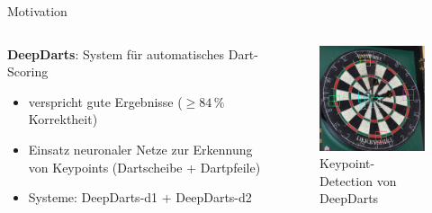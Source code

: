 \begin{frame}{Motivation}

    \begin{columns}
        \begin{column}{0.6\linewidth}

            \textbf{DeepDarts}: System für automatisches Dart-Scoring
            \begin{itemize}
                \item verspricht gute Ergebnisse ($\geq 84\,\%$ Korrektheit)
                \item Einsatz neuronaler Netze zur Erkennung von Keypoints (Dartscheibe + Dartpfeile)
                \item Systeme: DeepDarts-d1 + DeepDarts-d2
            \end{itemize}

        \end{column}
        \begin{column}{0.4\linewidth}

            \begin{figure}
                \centering
                \includegraphics[width=0.8\linewidth]{imgs/dd_keypoints.pdf}
                \vspace*{-0.2cm}
                \caption{Keypoint-Detection von DeepDarts}
            \end{figure}

        \end{column}
    \end{columns}

    \vspace*{-0.2cm}


\end{frame}

